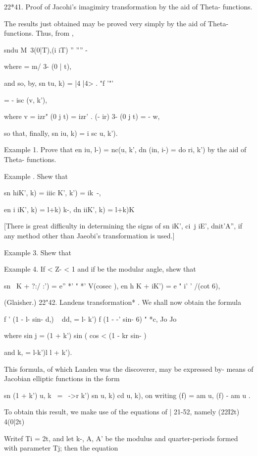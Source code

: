 22*41. Proof of Jacohi's imagimiry transformation by the aid of Theta-
functions.

The results just obtained may be proved very simply by the aid of
Theta-functions. Thus, from ,

sndu M\ 3(0|T),(i iT) '' '''' -%

where = m/ 3- (0 | t),

and so, by, sn tu, k) = |4 |4> . "f '"'

= - isc (v, k'),

where v = izr" (0 j t) = izr' . (- ir) 3- (0 j t) = - w,

so that, finally, sn iu, k) = i sc u, k').

Example 1. Prove that en iu, l-) = nc(u, k', dn (in, i-) = do ri, k')
by the aid of Theta- functions.

Example . Shew that

sn hiK', k) = iiic K', k') = ik~-,

en i iK', k) = l+k) k-, dn iiK', k) = l+k)K

[There is great difficulty in determining the signs of sn iK', ci\ j
iE', dnit'A'', if any method other than Jaeobi's transformation is
used.]

%
%

Example 3. Shew that

Example 4. If < Z- < 1 and if be the modular angle, shew that

sn \ K + ?:/ :') = e'' *' " *' V(cosec ), en h K + iK') = e " i' '
/(cot 6),

(Glaisher.) 22"42. Landens transformation* . We shall now obtain the
formula

f ' (1 - l- sin- d,) ~ dd, = l- k') f (1 - -' sin- 6) " *c, Jo Jo

where sin j = (1 + k') sin ( cos < (1 - kr sin- ) ~

and k, = l-k')l l + k').

This formula, of which Landen was the discoverer, may be expressed by-
means of Jacobian elliptic functions in the form

sn (1 + k') u, k \ = \ ->r k') sn u, k) cd u, k), on writing (f) = am
u, (f) - am u .

To obtain this result, we make use of the equations of | 21-52, namely
(22I2t) 4(0|2t)

Writef Ti = 2t, and let k-, A, A' be the modulus and quarter-periods
formed with parameter Tj; then the equation

